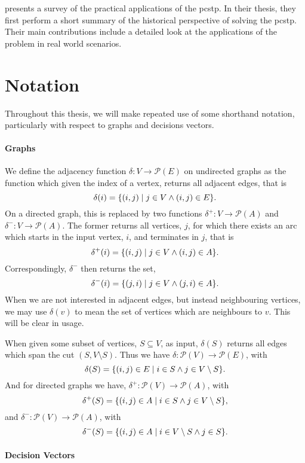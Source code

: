 \citet*{sun2018classical} presents a survey of the practical applications of the \gls{pcstp}.
In their thesis, they first perform a short summary of the historical perspective of
solving the \gls{pcstp}. Their main contributions include
a detailed look at the applications
of the problem in real world scenarios.

\section{Notation}\label{sec:intro:notation}

Throughout this thesis, we will make repeated use of some shorthand notation, particularly
with respect to graphs and decisions vectors.

\paragraph{Graphs}

We define the adjacency function $\delta : V \to \mathcal{P} (E)$ on undirected graphs as
the function which given the index of a vertex, returns all adjacent edges, that is
\[\delta(i) = \{(i,j) \mid j \in V \wedge (i, j) \in E\}\mathnormal{.}\]
On a directed graph, this is replaced by two functions
$\delta^+ : V \to \mathcal{P} (A)$
and $\delta^-: V \to \mathcal{P} (A)$.
The former returns all vertices, $j$, for which there exists an arc
which starts in the input vertex, $i$, and terminates in $j$, that is
\[\delta^+(i) = \{(i, j) \mid j \in V \wedge (i, j) \in A\}\mathnormal{.}\]
Correspondingly, $\delta^-$ then returns the set,
\[\delta^-(i) = \{(j, i) \mid j \in V \wedge (j, i) \in A\}\mathnormal{.}\]
When we are not interested in adjacent edges, but instead neighbouring vertices,
we may use $\delta(v)$ to mean the set of vertices which are neighbours to $v$.
This will be clear in usage.


When given some subset of vertices, $S \subseteq V$, as input,
$\delta(S)$ returns all edges which span the cut $(S, V \setminus S)$.
Thus we have $\delta : \mathcal{P}(V) \to \mathcal{P}(E)$, with
\[\delta(S) = \{(i,j) \in E \mid i \in S \wedge j \in V \setminus S\}\mathnormal{.}\]
And for directed graphs we have, $\delta^+ : \mathcal{P}(V) \to \mathcal{P}(A)$, with
\[\delta^+(S) = \{(i,j) \in A \mid i \in S \wedge j \in V \setminus S\}\mathnormal{,}\]
and $\delta^- : \mathcal{P}(V) \to \mathcal{P}(A)$, with
\[\delta^-(S) = \{(i,j) \in A \mid i \in V \setminus S \wedge j \in S\}\mathnormal{.}\]

\paragraph{Decision Vectors}

